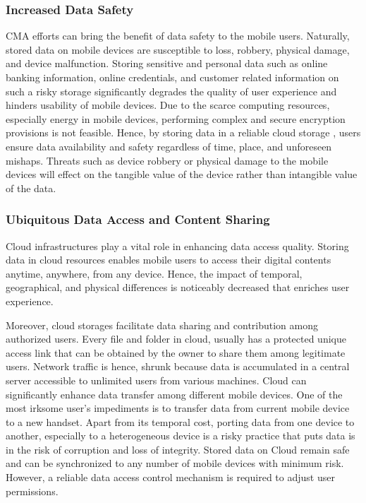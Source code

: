 \documentclass[publish]{IEEEtran}
\begin{document}
\subsubsection{Increased Data Safety}
CMA efforts can bring the benefit of data safety to the mobile users. Naturally, stored data on mobile devices are susceptible to loss, robbery, physical damage, and device malfunction. Storing sensitive and personal data such as online banking information, online credentials, and customer related information on such a risky storage significantly degrades the quality of user experience and hinders usability of mobile devices. Due to the scarce computing resources, especially energy in mobile devices, performing complex and secure encryption provisions is not feasible. Hence, by storing data in a reliable cloud storage \cite{Zeng2009, Zheng2010}, users ensure data availability and safety regardless of time, place, and unforeseen mishaps. Threats such as device robbery or physical damage to the mobile devices will effect on the tangible value of the device rather than intangible value of the data.

\subsubsection{Ubiquitous Data Access and Content Sharing}
Cloud infrastructures play a vital role in enhancing data access quality. Storing data in cloud resources enables mobile users to access their digital contents anytime, anywhere, from any device. Hence, the impact of temporal, geographical, and physical differences is noticeably decreased that enriches user experience.

Moreover, cloud storages facilitate data sharing and contribution among authorized users. Every file and folder in cloud, usually has a protected unique access link that can be obtained by the owner to share them among legitimate users. Network traffic is hence, shrunk because data is accumulated in a central server accessible to unlimited users from various machines. Cloud can significantly enhance data transfer among different mobile devices. One of the most irksome user's impediments is to transfer data from current mobile device to a new handset. Apart from its temporal cost, porting data from one device to another, especially to a heterogeneous device is a risky practice that puts data is in the risk of corruption and loss of integrity. Stored data on Cloud remain safe and can be synchronized to any number of mobile devices with minimum risk. However, a reliable data access control mechanism is required to adjust user permissions. 
\end{document}
